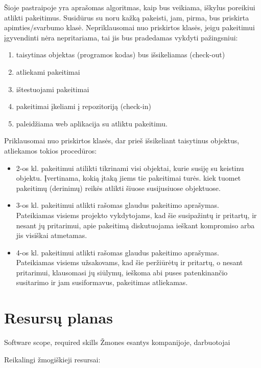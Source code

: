 \documentclass[a4paper,12pt]{article}
\begin{document}
Šioje pastraipoje yra aprašomas algoritmas, kaip bus veikiama, iškylus poreikiui atlikti pakeitimus. 
Susidūrus su noru kažką pakeisti, jam, pirma, bus priskirta apimties/svarbumo klasė. Nepriklausomai nuo priskirtos klasės, jeigu pakeitimui įgyvendinti nėra nepritariama, tai jis bus pradedamas vykdyti pažingsniui: 
\begin{enumerate}
	\item taisytinas objektas (programos kodas) bus išsikeliamas
 (check-out)
 	\item atliekami pakeitimai
 	\item ištestuojami pakeitimai
 	\item pakeitimai įkeliami į repozitoriją (check-in)
 	\item paleidžiama web aplikacija su atliktu pakeitimu.
\end{enumerate}
Priklausomai nuo priskirtos klasės, dar prieš išsikeliant taisytinus objektus, atliekamos tokios procedūros: 
\begin{itemize}
	\item 2-os kl. pakeitimui atilikti tikrinami visi objektai, kurie susiję su keistinu objektu.
		Įvertinama, kokią įtaką jiems tie pakeitimai turės. kiek tuomet pakeitimų (derinimų) reikės atlikti šiuose susijusiuose objektuose.		
	\item 3-os kl. pakeitimui atlikti rašomas glaudus pakeitimo aprašymas.\\
	Pateikiamas visiems projekto vykdytojams, kad šie susipažintų ir pritartų, ir nesant jų pritarimui, apie pakeitimą diskutuojama ieškant kompromiso arba jis visiškai atmetamas.
	\item 4-os kl. pakeitimui atlikti rašomas glaudus pakeitimo aprašymas.\\
	Pateikiamas visiems užsakovams, kad šie peržiūrėtų ir pritartų, o nesant pritarimui, klausomasi jų siūlymų, ieškoma abi puses patenkinančio susitarimo ir jam susiformavus, pakeitimas atliekamas. 
\end{itemize}
 
\section{Resursų planas}
Software scope, required skills
Žmones esantys kompanijoje, darbuotojai

Reikalingi žmogiškieji resursai:
\end{document}
